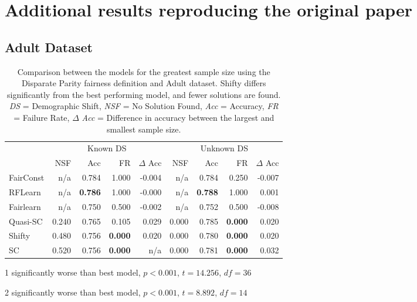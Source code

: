 \appendix
\newpage
\section{Additional results reproducing the original paper}
\label{add_original}
\subsection{Adult Dataset}

\begin{table}[H]
\begin{threeparttable}
\centering

\begin{tabular}{lrrrrrrrr}
\toprule
 & \multicolumn{4}{c}{Known DS} & \multicolumn{4}{c}{Unknown DS} \\
 & NSF & Acc & FR & $\Delta$ Acc & NSF & Acc & FR & $\Delta$ Acc \\
\cmidrule(r){2-5} \cmidrule{6-9}
FairConst & n/a & 0.784 & 1.000 & -0.004 & n/a & 0.784 & 0.250 & -0.007 \\
RFLearn & n/a & \bfseries 0.786 & 1.000 & -0.000 & n/a & \bfseries 0.788 & 1.000 & 0.001 \\
Fairlearn & n/a & 0.750 & 0.500 & -0.002 & n/a & 0.752 & 0.500 & -0.008 \\
Quasi-SC & 0.240 & 0.765 & 0.105 & 0.029 & 0.000 & 0.785 & \bfseries 0.000 & 0.020 \\
Shifty & 0.480 & 0.756\tnote{1} & \bfseries 0.000 & 0.020 & 0.000 & 0.780\tnote{2} & \bfseries 0.000 & 0.020 \\
SC & 0.520 & 0.756 & \bfseries 0.000 & n/a & 0.000 & 0.781 & \bfseries 0.000 & 0.032 \\
\bottomrule
\end{tabular}
\begin{tablenotes}
\item[1] significantly worse than best model, $p<0.001$, $t=14.256$, $df=36$
\item[2] significantly worse than best model, $p<0.001$, $t=8.892$, $df=14$
\end{tablenotes}
\end{threeparttable}
\caption{Comparison between the models for the greatest sample size using the Disparate Parity fairness definition and Adult dataset. Shifty differs significantly from the best performing model, and fewer solutions are found.  \textit{DS} = Demographic Shift, \textit{NSF} = No Solution Found, \textit{Acc} = Accuracy, \textit{FR} = Failure Rate, $\Delta$ \textit{Acc} = Difference in accuracy between the largest and smallest sample size.}
\label{dp_adult}
\end{table}
